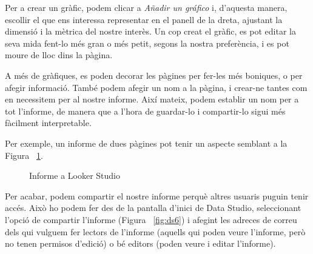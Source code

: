 \documentclass[12pt,longbibliography]{article}
\theoremstyle{definition}
\theoremstyle{remark}
\begin{document}
Per a crear un gràfic, podem clicar a \textit{Añadir un gráfico} i, d'aquesta manera, escollir el que ens interessa representar en el panell de la dreta, ajustant la dimensió i la mètrica del nostre interès. Un cop creat el gràfic, es pot editar la seva mida fent-lo més gran o més petit, segons la nostra preferència, i es pot moure de lloc dins la pàgina.

A més de gràfiques, es poden decorar les pàgines per fer-les més boniques, o per afegir informació. També podem afegir un nom a la pàgina, i crear-ne tantes com en necessitem per al nostre informe. Així mateix, podem establir un nom per a tot l'informe, de manera que a l'hora de guardar-lo i compartir-lo sigui més fàcilment interpretable.

Per exemple, un informe de dues pàgines pot tenir un aspecte semblant a la Figura ~\ref{fig:ds4}.

\begin{figure}[h!]
\par
{}%
\hfill
{}%
\par

\caption{Informe a Looker Studio}
\label{fig:ds4}
\end{figure}


Per acabar, podem compartir el nostre informe perquè altres usuaris puguin tenir accés. Això ho podem fer des de la pantalla d'inici de Data Studio, seleccionant l'opció de compartir l'informe (Figura ~\ref{fig:ds6}) i afegint les adreces de correu dels qui vulguem fer lectors de l'informe (aquells qui poden veure l'informe, però no tenen permisos d'edició) o bé editors (poden veure i editar l'informe). 
\end{document}
